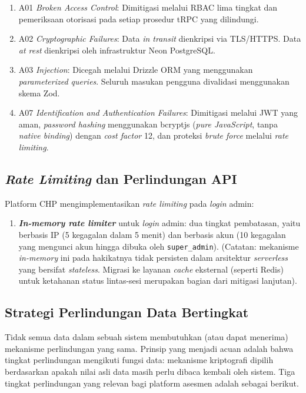 \begin{enumerate}[leftmargin=2cm]
  \item A01 \textit{Broken Access Control}: Dimitigasi melalui RBAC lima tingkat dan pemeriksaan otorisasi pada setiap prosedur tRPC yang dilindungi.
  \item A02 \textit{Cryptographic Failures}: Data \textit{in transit} dienkripsi via TLS/HTTPS. Data \textit{at rest} dienkripsi oleh infrastruktur Neon PostgreSQL.
  \item A03 \textit{Injection}: Dicegah melalui Drizzle ORM yang menggunakan \textit{parameterized queries}. Seluruh masukan pengguna divalidasi menggunakan skema Zod.
  \item A07 \textit{Identification and Authentication Failures}: Dimitigasi melalui JWT yang aman, \textit{password hashing} menggunakan bcryptjs (\textit{pure JavaScript}, tanpa \textit{native binding}) dengan \textit{cost factor} 12, dan proteksi \textit{brute force} melalui \textit{rate limiting}.
\end{enumerate}

\subsection{\textit{Rate Limiting} dan Perlindungan API}
\label{subsec:rate-limiting}

Platform CHP mengimplementasikan \textit{rate limiting} pada \textit{login} admin:

\begin{enumerate}[leftmargin=2cm]
  \item \textbf{\textit{In-memory rate limiter}} untuk \textit{login} admin: dua tingkat pembatasan, yaitu berbasis IP (5 kegagalan dalam 5 menit) dan berbasis akun (10 kegagalan yang mengunci akun hingga dibuka oleh \texttt{super\_admin}). (Catatan: mekanisme \textit{in-memory} ini pada hakikatnya tidak persisten dalam arsitektur \textit{serverless} yang bersifat \textit{stateless}. Migrasi ke layanan \textit{cache} eksternal (seperti Redis) untuk ketahanan status lintas-sesi merupakan bagian dari mitigasi lanjutan).
\end{enumerate}

\subsection{Strategi Perlindungan Data Bertingkat}
\label{subsec:perlindungan-bertingkat}

Tidak semua data dalam sebuah sistem membutuhkan (atau dapat menerima) mekanisme perlindungan yang sama. Prinsip yang menjadi acuan adalah bahwa tingkat perlindungan mengikuti fungsi data: mekanisme kriptografi dipilih berdasarkan apakah nilai asli data masih perlu dibaca kembali oleh sistem. Tiga tingkat perlindungan yang relevan bagi platform asesmen adalah sebagai berikut.


